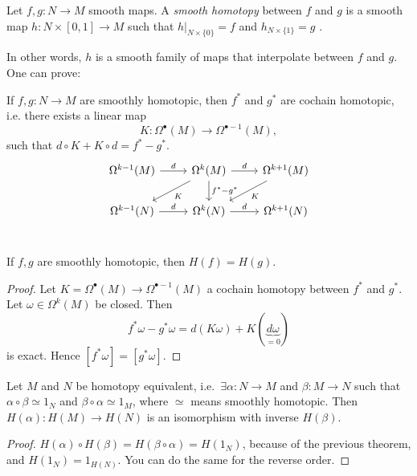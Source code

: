 \begin{definition}
    Let $f, g: N \to M$ smooth maps.
    A \emph{smooth homotopy} between $f$ and $g$ is a smooth map $h: N \times [0, 1] \to  M$ such that $h|_{N\times \{0\}} = f$ and $h_{N\times \{1\}} = g$ .
\end{definition}
In other words,  $h$ is a smooth family of maps that interpolate between $f$ and $g$.
\filbreak
One can prove:
\begin{prop}
    If $f, g: N \to  M$ are smoothly homotopic, then
    $f^*$ and $g^*$ are cochain homotopic, i.e. there exists a linear map \[K: \Omega^{\bullet}(M)  \to  \Omega^{\bullet - 1}(M),\]
    such that $d  \circ  K + K  \circ  d = f^* - g^*$.
    \[
        \begin{tikzcd}
            \Omega^{k-1}(M) \arrow[r, "d"] & \Omega^{k}(M) \arrow[d, "f^*- g^*"] \arrow[dl, "K"]\arrow[r, "d"] & \Omega^{k+1}(M) \arrow[dl, "K"]\\
            \Omega^{k-1}(N) \arrow[r, "d"] & \Omega^{k}(N)  \arrow[r, "d"] & \Omega^{k+1}(N) \\
        \end{tikzcd}
    \]
\end{prop}
\begin{theorem}
    If $f, g$ are smoothly homotopic, then $H(f) = H(g)$.
\end{theorem}
\begin{proof}
    Let $K = \Omega^{\bullet}(M)  \to  \Omega^{\bullet - 1}(M) $ a cochain homotopy between $f^*$ and $g^*$.
    Let $\omega \in \Omega^{k}(M) $ be closed.
    Then     
    $$        f^*\omega - g^*\omega = d ( K\omega)  + K  ( \underbrace{d \omega}_{=0})$$     is exact. Hence $ [f^*\omega] =[g^*\omega]$.
\end{proof}

\begin{corollary}
    Let $M$ and $N$ be homotopy equivalent, i.e.\ $\exists \alpha:N \to  M$ and $\beta: M \to N$ such that $\alpha  \circ  \beta \simeq 1_{N}$ and $\beta  \circ  \alpha \simeq 1_{M}$, where $\simeq$ means smoothly homotopic.
    Then $H(\alpha): H(M) \to  H(N)$ is an isomorphism with inverse $H(\beta)$.
\end{corollary}
\begin{proof}
    $H(\alpha)  \circ  H(\beta)= H(\beta  \circ \alpha) = H(1_{N})$, because of the previous theorem, and $H(1_N) = 1_{H(N)}$.    You can do the same for the reverse order.
\end{proof}


